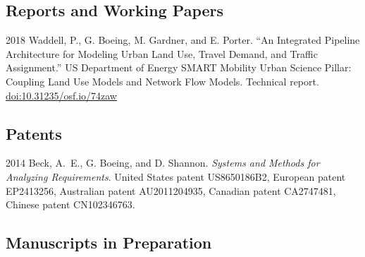 \documentclass[12pt,letterpaper]{report}
\begin{document}
	
	
	\subsection*{Reports and Working Papers}
	
	\begin{tablist}
		
		\item[2018] \tab Waddell, P., G. Boeing, M. Gardner, and E. Porter. \enquote{An Integrated Pipeline Architecture for Modeling Urban Land Use, Travel Demand, and Traffic Assignment.} US Department of Energy SMART Mobility Urban Science Pillar: Coupling Land Use Models and Network Flow Models. Technical report. \href{https://doi.org/10.31235/osf.io/74zaw}{doi:10.31235/osf.io/74zaw}
		
	\end{tablist}
	
	
	
	\subsection*{Patents}
	
	\begin{tablist}
		
		\item[2014] \tab Beck, A.~E., G. Boeing, and D. Shannon. \textit{Systems and Methods for Analyzing Requirements}. United States patent US8650186B2, European patent EP2413256, Australian patent AU2011204935, Canadian patent CA2747481, Chinese patent CN102346763.
		
	\end{tablist}
	
	
	
	\subsection*{Manuscripts in Preparation}
	
\end{document}
